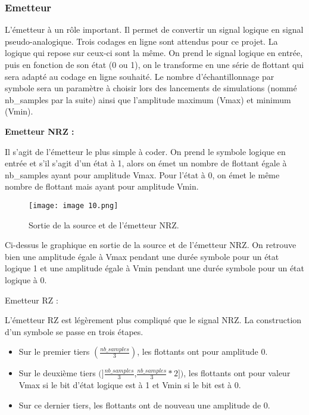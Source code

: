 \subsubsection{Emetteur}

L'émetteur à un rôle important. Il permet de convertir un signal logique en signal pseudo-analogique. Trois codages en ligne sont attendus pour ce projet. La logique qui repose sur ceux-ci sont la même. On prend le signal logique en entrée, puis en fonction de son état (0 ou 1), on le transforme en une série de flottant qui sera adapté au codage en ligne souhaité. Le nombre d'échantillonnage par symbole sera un paramètre à choisir lors des lancements de simulations (nommé nb\_samples par la suite) ainsi que l'amplitude maximum (Vmax) et minimum (Vmin).

\textbf{Emetteur NRZ :}

Il s'agit de l'émetteur le plus simple à coder. On prend le symbole logique en entrée et s'il s'agit d'un état à 1, alors on émet un nombre de flottant égale à nb\_samples ayant pour amplitude Vmax. Pour l'état à 0, on émet le même nombre de flottant mais ayant pour amplitude Vmin.

\begin{figure}[h]
    \centering
    \texttt{[image: image 10.png]}
    \caption{\label{fig:image10}Sortie de la source et de l'émetteur NRZ.}
\end{figure}

Ci-dessus le graphique en sortie de la source et de l'émetteur NRZ. On retrouve bien une amplitude égale à Vmax pendant une durée symbole pour un état logique 1 et une amplitude égale à Vmin pendant une durée symbole pour un état logique à 0.

Emetteur RZ :

L'émetteur RZ est légèrement plus compliqué que le signal NRZ. La construction d'un symbole se passe en trois étapes.

\begin{itemize}
    \item Sur le premier tiers $(\frac{nb\_samples}{3})$, les flottants ont pour amplitude 0.
    \item Sur le deuxième tiers $(]\frac{nb\_samples}{3}$,$\frac{nb\_samples}{3}*2])$, les flottants ont pour valeur Vmax si le bit d'état logique est à 1 et Vmin si le bit est à 0.
    \item Sur ce dernier tiers, les flottants ont de nouveau une amplitude de 0.
\end{itemize}

